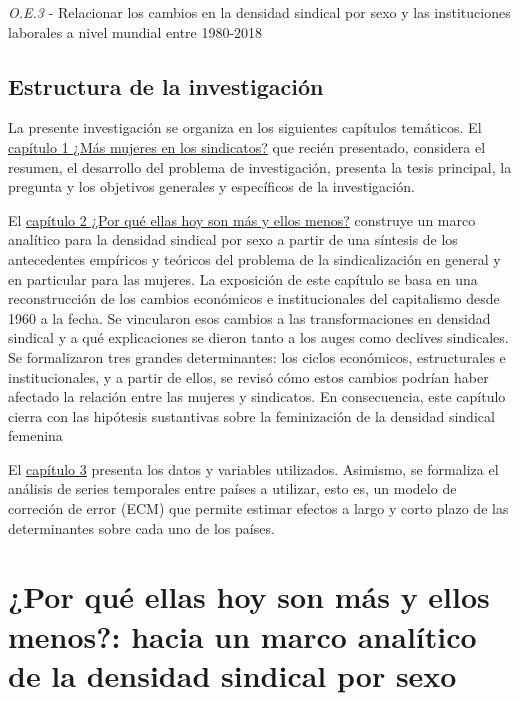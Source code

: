 \documentclass[
]{book}
\begin{document}
\emph{O.E.3} - Relacionar los cambios en la densidad sindical por sexo y las instituciones laborales a nivel mundial entre 1980-2018

\hypertarget{estructura-de-la-investigaciuxf3n}{%
\section{Estructura de la investigación}\label{estructura-de-la-investigaciuxf3n}}

La presente investigación se organiza en los siguientes capítulos temáticos. El \protect\hyperlink{intro}{capítulo 1 ¿Más mujeres en los sindicatos?} que recién presentado, considera el resumen, el desarrollo del problema de investigación, presenta la tesis principal, la pregunta y los objetivos generales y específicos de la investigación.

El \protect\hyperlink{cap2}{capítulo 2 ¿Por qué ellas hoy son más y ellos menos?} construye un marco analítico para la densidad sindical por sexo a partir de una síntesis de los antecedentes empíricos y teóricos del problema de la sindicalización en general y en particular para las mujeres. La exposición de este capítulo se basa en una reconstrucción de los cambios económicos e institucionales del capitalismo desde 1960 a la fecha. Se vincularon esos cambios a las transformaciones en densidad sindical y a qué explicaciones se dieron tanto a los auges como declives sindicales. Se formalizaron tres grandes determinantes: los ciclos económicos, estructurales e institucionales, y a partir de ellos, se revisó cómo estos cambios podrían haber afectado la relación entre las mujeres y sindicatos. En consecuencia, este capítulo cierra con las hipótesis sustantivas sobre la feminización de la densidad sindical femenina

El \protect\hyperlink{cap3}{capítulo 3} presenta los datos y variables utilizados. Asimismo, se formaliza el análisis de series temporales entre países a utilizar, esto es, un modelo de correción de error (ECM) que permite estimar efectos a largo y corto plazo de las determinantes sobre cada uno de los países.

\hypertarget{por-quuxe9-ellas-hoy-son-muxe1s-y-ellos-menos-hacia-un-marco-analuxedtico-de-la-densidad-sindical-por-sexo}{%
\chapter{¿Por qué ellas hoy son más y ellos menos?: hacia un marco analítico de la densidad sindical por sexo}\label{por-quuxe9-ellas-hoy-son-muxe1s-y-ellos-menos-hacia-un-marco-analuxedtico-de-la-densidad-sindical-por-sexo}}
\end{document}
